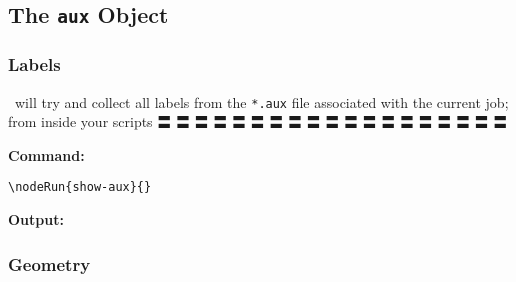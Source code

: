 






\subsection{The \texttt{aux} Object}\label{aux}



\subsubsection{Labels}\label{labels}

\CXLTX\ will try and collect all labels from the \verb#*.aux# file associated with the current job; from
inside your scripts 〓 〓 〓 〓 〓 〓 〓 〓 〓 〓 〓 〓 〓 〓 〓 〓 〓 〓 〓

{\textbf{Command:}}

\begin{verbatim}
\nodeRun{show-aux}{}
\end{verbatim}

{\textbf{Output:}}

{\fontsize{3mm}{3mm}}



\subsubsection{Geometry}\label{geo}


